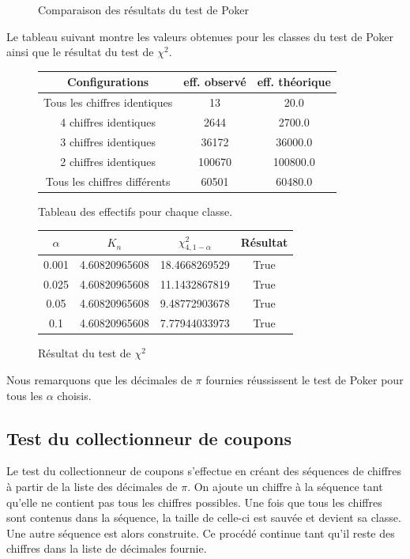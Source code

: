 \documentclass[10pt,a4paper]{article}
\begin{document}
\begin{figure}[H]
\caption{Comparaison des résultats du test de Poker}
\label{pokerhisto}
\end{figure}

Le tableau suivant montre les valeurs obtenues pour les classes du test de Poker ainsi que le résultat du test de $\chi^2$.
\begin{figure}[H]
\begin{center}
\begin{longtable}{|c|c|c|}
\hline
Configurations & eff. observé & eff. théorique\\
\hline
Tous les chiffres identiques & 13 & 20.0\\
4 chiffres identiques & 2644 & 2700.0\\
3 chiffres identiques & 36172 & 36000.0\\
2 chiffres identiques & 100670 & 100800.0\\
Tous les chiffres différents & 60501 & 60480.0\\
\hline
\end{longtable}
\end{center}
\caption{Tableau des effectifs pour chaque classe.}
\end{figure}
\begin{figure}[H]
\begin{center}
\begin{tabular}{|c|c|c|c|}
\hline
$\alpha$ & $K_{n}$ & $\chi^2_{4, 1 - \alpha}$ & Résultat\\
\hline
0.001 & 4.60820965608 & 18.4668269529 & True\\
0.025 & 4.60820965608 & 11.1432867819 & True\\
0.05 & 4.60820965608 & 9.48772903678 & True\\
0.1 & 4.60820965608 & 7.77944033973 & True\\
\hline
\end{tabular}
\end{center}
\caption{Résultat du test de $\chi^2$}
\end{figure} 

Nous remarquons que les décimales de $\pi$ fournies réussissent le test de Poker pour tous les $\alpha$ choisis.
\subsection{Test du collectionneur de coupons}
Le test du collectionneur de coupons s'effectue en créant des séquences de chiffres à partir de la liste des décimales de $\pi$. On ajoute un chiffre à la séquence tant qu'elle ne contient pas tous les chiffres possibles. Une fois que tous les chiffres sont contenus dans la séquence, la taille de celle-ci est sauvée et devient sa classe. Une autre séquence est alors construite. Ce procédé continue tant qu'il reste des chiffres dans la liste de décimales fournie.\newline
\end{document}
